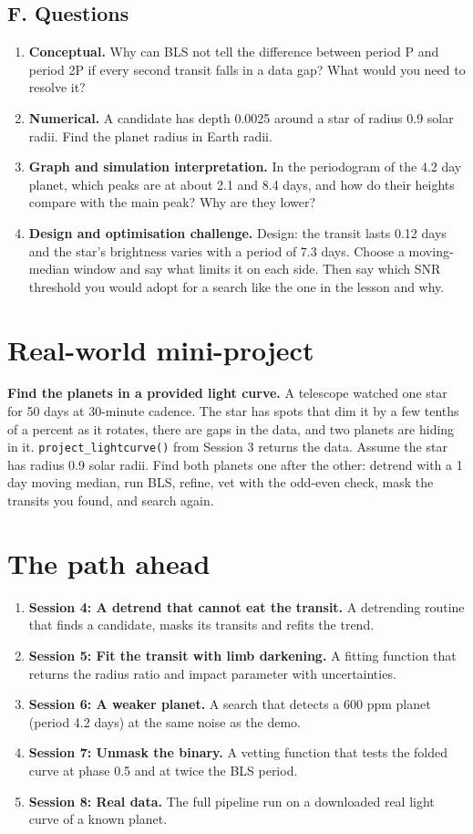 \documentclass[11pt,a4paper]{article}
\begin{document}
\subsection*{F. Questions}
\begin{enumerate}[nosep]
\item \textbf{Conceptual.} Why can BLS not tell the difference between period P and period 2P if every second transit falls in a data gap? What would you need to resolve it?
\item \textbf{Numerical.} A candidate has depth 0.0025 around a star of radius 0.9 solar radii. Find the planet radius in Earth radii.
\item \textbf{Graph and simulation interpretation.} In the periodogram of the 4.2 day planet, which peaks are at about 2.1 and 8.4 days, and how do their heights compare with the main peak? Why are they lower?
\item \textbf{Design and optimisation challenge.} Design: the transit lasts 0.12 days and the star's brightness varies with a period of 7.3 days. Choose a moving-median window and say what limits it on each side. Then say which SNR threshold you would adopt for a search like the one in the lesson and why.
\end{enumerate}

\section{Real-world mini-project}
\textbf{Find the planets in a provided light curve.} A telescope watched one star for 50 days at 30-minute cadence. The star has spots that dim it by a few tenths of a percent as it rotates, there are gaps in the data, and two planets are hiding in it. \texttt{project\_lightcurve()} from Session 3 returns the data. Assume the star has radius 0.9 solar radii. Find both planets one after the other: detrend with a 1 day moving median, run BLS, refine, vet with the odd-even check, mask the transits you found, and search again.

\section{The path ahead}
\begin{enumerate}[nosep]
\item \textbf{Session 4: A detrend that cannot eat the transit.} A detrending routine that finds a candidate, masks its transits and refits the trend.
\item \textbf{Session 5: Fit the transit with limb darkening.} A fitting function that returns the radius ratio and impact parameter with uncertainties.
\item \textbf{Session 6: A weaker planet.} A search that detects a 600 ppm planet (period 4.2 days) at the same noise as the demo.
\item \textbf{Session 7: Unmask the binary.} A vetting function that tests the folded curve at phase 0.5 and at twice the BLS period.
\item \textbf{Session 8: Real data.} The full pipeline run on a downloaded real light curve of a known planet.
\end{enumerate}
\end{document}
